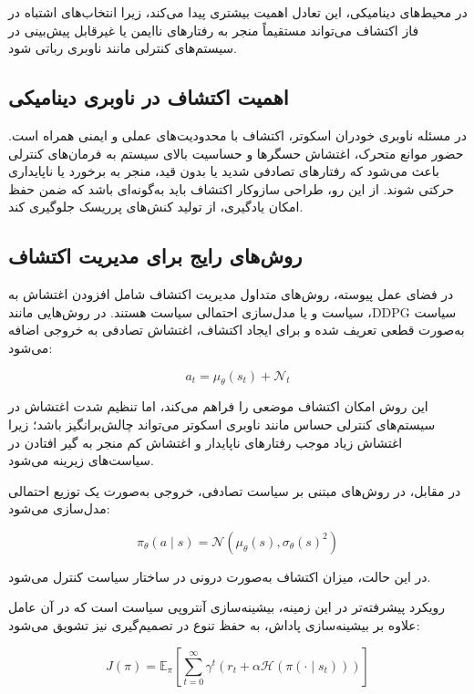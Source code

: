 در محیط‌های دینامیکی، این تعادل اهمیت بیشتری پیدا می‌کند، زیرا انتخاب‌های اشتباه در فاز اکتشاف می‌تواند مستقیماً منجر به رفتارهای ناایمن یا غیرقابل پیش‌بینی در سیستم‌های کنترلی مانند ناوبری رباتی شود.

\subsection{اهمیت اکتشاف در ناوبری دینامیکی}

در مسئله ناوبری خودران اسکوتر، اکتشاف با محدودیت‌های عملی و ایمنی همراه است. حضور موانع متحرک، اغتشاش حسگرها و حساسیت بالای سیستم به فرمان‌های کنترلی باعث می‌شود که رفتارهای تصادفی شدید یا بدون قید، منجر به برخورد یا ناپایداری حرکتی شوند. از این رو، طراحی سازوکار اکتشاف باید به‌گونه‌ای باشد که ضمن حفظ امکان یادگیری، از تولید کنش‌های پرریسک جلوگیری کند.

\subsection{روش‌های رایج برای مدیریت اکتشاف}

در فضای عمل پیوسته، روش‌های متداول مدیریت اکتشاف شامل افزودن اغتشاش به سیاست و یا مدل‌سازی احتمالی سیاست هستند. در روش‌هایی مانند ،DDPG سیاست به‌صورت قطعی تعریف شده و برای ایجاد اکتشاف، اغتشاش تصادفی به خروجی اضافه می‌شود:

\begin{equation}
	a_t = \mu_\theta(s_t) + \mathcal{N}_t
\end{equation}

این روش امکان اکتشاف موضعی را فراهم می‌کند، اما تنظیم شدت اغتشاش در سیستم‌های کنترلی حساس مانند ناوبری اسکوتر می‌تواند چالش‌برانگیز باشد؛ زیرا اغتشاش زیاد موجب رفتارهای ناپایدار و اغتشاش کم منجر به گیر افتادن در سیاست‌های زیرینه می‌شود.

در مقابل، در روش‌های مبتنی بر سیاست تصادفی، خروجی به‌صورت یک توزیع احتمالی مدل‌سازی می‌شود:

\begin{equation}
	\pi_\theta(a \mid s) = \mathcal{N}(\mu_\theta(s), \sigma_\theta(s)^2)
\end{equation}

در این حالت، میزان اکتشاف به‌صورت درونی در ساختار سیاست کنترل می‌شود.

رویکرد پیشرفته‌تر در این زمینه، بیشینه‌سازی آنتروپی سیاست است که در آن عامل علاوه بر بیشینه‌سازی پاداش، به حفظ تنوع در تصمیم‌گیری نیز تشویق می‌شود:

\begin{equation}
	J(\pi) =
	\mathbb{E}_\pi
	\left[
	\sum_{t=0}^{\infty}
	\gamma^t
	\left(
	r_t + \alpha \mathcal{H}(\pi(\cdot \mid s_t))
	\right)
	\right]
\end{equation}

